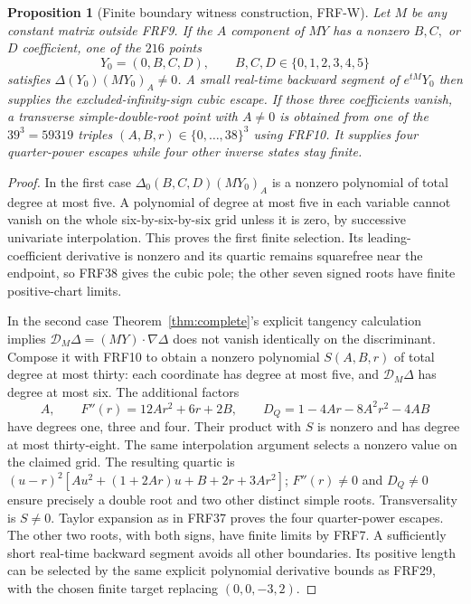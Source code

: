 \documentclass[11pt]{article}
\newtheorem{proposition}[theorem]{Proposition}
\begin{document}
\begin{proposition}[Finite boundary witness construction, FRF-W]
Let $M$ be any constant matrix outside FRF9.
If the $A$ component of $MY$ has a nonzero $B,C,$ or $D$ coefficient,
one of the $216$ points
\[
 Y_0=(0,B,C,D),\qquad B,C,D\in\{0,1,2,3,4,5\}
\]
satisfies $\Delta(Y_0)(MY_0)_A\ne0$. A small real-time backward segment
of $e^{tM}Y_0$ then supplies the excluded-infinity-sign cubic escape.
If those three coefficients vanish, a transverse simple-double-root
point with $A\ne0$ is obtained from one of the $39^3=59319$ triples
$(A,B,r)\in\{0,\ldots,38\}^3$ using FRF10. It supplies four
quarter-power escapes while four other inverse states stay finite.
\end{proposition}
\begin{proof}
In the first case $\Delta_0(B,C,D)(MY_0)_A$ is a nonzero polynomial of
total degree at most five. A polynomial of degree at most five in each
variable cannot vanish on the whole six-by-six-by-six grid unless it
is zero, by successive univariate interpolation. This proves the first
finite selection. Its leading-coefficient derivative is nonzero and its
quartic remains squarefree near the endpoint, so FRF38 gives the cubic
pole; the other seven signed roots have finite positive-chart limits.

In the second case Theorem~\ref{thm:complete}'s explicit tangency
calculation implies $\mathcal D_M\Delta=(MY)\cdot\nabla\Delta$ does
not vanish identically on the discriminant. Compose it with FRF10 to
obtain a nonzero polynomial $S(A,B,r)$ of total degree at most thirty:
each coordinate has degree at most five, and $\mathcal D_M\Delta$ has
degree at most six. The additional factors
\[
 A,\qquad F''(r)=12Ar^2+6r+2B,\qquad
 D_Q=1-4Ar-8A^2r^2-4AB
\]
have degrees one, three and four. Their product with $S$ is nonzero
and has degree at most thirty-eight. The same interpolation argument
selects a nonzero value on the claimed grid. The resulting quartic is
$(u-r)^2[Au^2+(1+2Ar)u+B+2r+3Ar^2]$; $F''(r)\ne0$ and $D_Q\ne0$
ensure precisely a double root and two other distinct simple roots.
Transversality is $S\ne0$. Taylor expansion as in FRF37 proves the
four quarter-power escapes. The other two roots, with both signs, have
finite limits by FRF7. A sufficiently short real-time backward segment
avoids all other boundaries. Its positive length can be selected by
the same explicit polynomial derivative bounds as FRF29, with the chosen
finite target replacing $(0,0,-3,2)$.
\end{proof}
\end{document}
